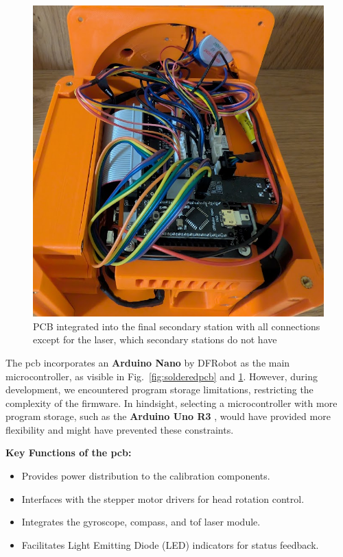 \begin{figure}[H]
	\centering
	\includegraphics[width=1.0\linewidth]{figures/pcb}
	\caption{PCB integrated into the final secondary station with all connections except for the laser, which secondary stations do not have}
	\label{fig:pcb}
\end{figure}

The \acrshort{pcb} incorporates an \textbf{Arduino Nano} by DFRobot \cite{arduino_nano_dfrobot} as the main microcontroller, as visible in Fig.~\ref{fig:solderedpcb} and \ref{fig:pcb}. However, during development, we encountered program storage limitations, restricting the complexity of the firmware. In hindsight, selecting a microcontroller with more program storage, such as the \textbf{Arduino Uno R3} \cite{arduino_uno_dfrobot}, would have provided more flexibility and might have prevented these constraints.

\textbf{Key Functions of the \acrshort{pcb}:}
\begin{itemize}
	\item Provides power distribution to the calibration components.
	\item Interfaces with the stepper motor drivers for head rotation control.
	\item Integrates the gyroscope, compass, and \acrshort{tof} laser module.
	\item Facilitates Light Emitting Diode (LED) indicators for status feedback.
\end{itemize}

